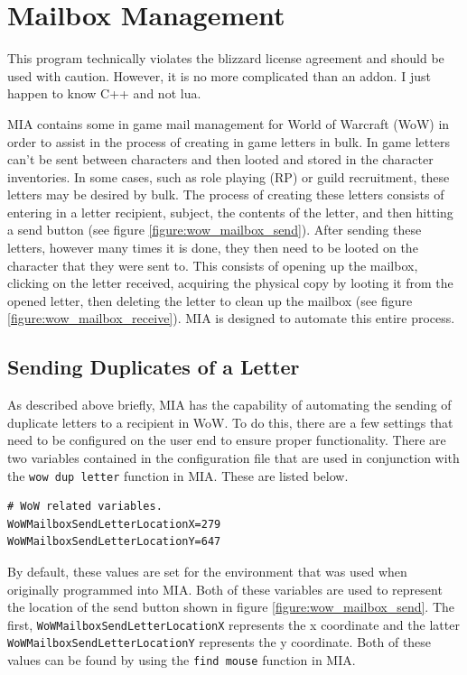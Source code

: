 \section{Mailbox Management} \label{WoWMailbox}

\begin{note}
	This program technically violates the blizzard license agreement and should be used with caution. However, it is no more complicated than an addon. I just happen to know C++ and not lua.
\end{note}

MIA contains some in game mail management for World of Warcraft (WoW) in order to assist in the process of creating in game letters in bulk. In game letters can't be sent between characters and then looted and stored in the character inventories. In some cases, such as role playing (RP) or guild recruitment, these letters may be desired by bulk. The process of creating these letters consists of entering in a letter recipient, subject, the contents of the letter, and then hitting a send button (see figure \ref{figure:wow_mailbox_send}). After sending these letters, however many times it is done, they then need to be looted on the character that they were sent to. This consists of opening up the mailbox, clicking on the letter received, acquiring the physical copy by looting it from the opened letter, then deleting the letter to clean up the mailbox (see figure \ref{figure:wow_mailbox_receive}). MIA is designed to automate this entire process.

\subsection{Sending Duplicates of a Letter}

As described above briefly, MIA has the capability of automating the sending of duplicate letters to a recipient in WoW. To do this, there are a few settings that need to be configured on the user end to ensure proper functionality. There are two variables contained in the configuration file that are used in conjunction with the \texttt{wow dup letter} function in MIA. These are listed below.

\begin{lstlisting}[style=pythonstyle]
# WoW related variables.
WoWMailboxSendLetterLocationX=279
WoWMailboxSendLetterLocationY=647
\end{lstlisting}

By default, these values are set for the environment that was used when originally programmed into MIA. Both of these variables are used to represent the location of the send button shown in figure \ref{figure:wow_mailbox_send}. The first, \texttt{WoWMailboxSendLetterLocationX} represents the x coordinate and the latter \texttt{WoWMailboxSendLetterLocationY} represents the y coordinate. Both of these values can be found by using the \texttt{find mouse} function in MIA. 

